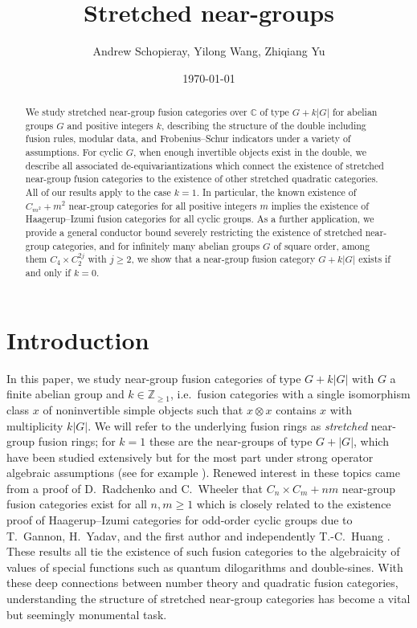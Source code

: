 \documentclass[10pt]{article}
\title{Stretched near-groups}
\author{Andrew Schopieray, Yilong Wang, Zhiqiang Yu}
\date{\today}
\theoremstyle{plain}
\theoremstyle{definition}
\theoremstyle{plain}
\begin{document}
\maketitle

\begin{abstract}
\noindent We study stretched near-group fusion categories over $\mathbb{C}$ of type $G+k|G|$ for abelian groups $G$ and positive integers $k$, describing the structure of the double including fusion rules, modular data, and Frobenius--Schur indicators under a variety of assumptions. For cyclic $G$, when enough invertible objects exist in the double, we describe all associated de-equivariantizations which connect the existence of stretched near-group fusion categories to the existence of other stretched quadratic categories. All of our results apply to the case $k=1$. In particular, the known existence of $C_{m^2}+m^2$ near-group categories for all positive integers $m$ implies the existence of Haagerup--Izumi fusion categories for all cyclic groups. As a further application, we provide a general conductor bound severely restricting the existence of stretched near-group categories, and for infinitely many abelian groups $G$ of square order, among them $C_4\times C_2^{2j}$ with $j\geq2$, we show that a near-group fusion category $G+k|G|$ exists if and only if $k=0$.
\end{abstract}
\tableofcontents

\section{Introduction}

\par In this paper, we study near-group fusion categories of type $G+k|G|$ with $G$ a finite abelian group and $k\in\mathbb{Z}_{\geq1}$, i.e.\ fusion categories with a single isomorphism class $x$ of noninvertible simple objects such that $x\otimes x$ contains $x$ with multiplicity $k|G|$. We will refer to the underlying fusion rings as \emph{stretched} near-group fusion rings; for $k=1$ these are the near-groups of type $G+|G|$, which have been studied extensively but for the most part under strong operator algebraic assumptions (see for example \cite{MR2837122,MR3167494,MR3635673,MR5015436}).  Renewed interest in these topics came from a proof of D.\ Radchenko and C.\ Wheeler that $C_n\times C_m+nm$ near-group fusion categories exist for all $n,m\geq1$ \cite{radchenko2026realquadraticfieldsfinite} which is closely related to the existence proof of Haagerup--Izumi categories for odd-order cyclic groups due to T.\ Gannon, H.\ Yadav, and the first author \cite{gannon2026haagerupizumifusioncategories} and independently T.-C.\ Huang \cite{huang2026cyclichaagerupizumifusioncategories}.  These results all tie the existence of such fusion categories to the algebraicity of values of special functions such as quantum dilogarithms and double-sines. With these deep connections between number theory and quadratic fusion categories, understanding the structure of stretched near-group categories has become a vital but seemingly monumental task.
\end{document}
